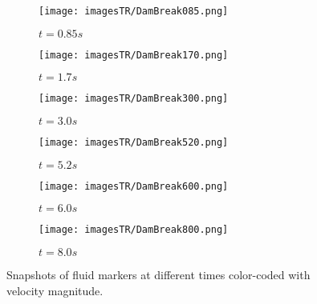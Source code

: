 \begin{figure}[t]
	\centering
	\begin{subfigure}{0.45\columnwidth}
			\centering
		\texttt{[image: imagesTR/DamBreak085.png]}
		\caption{$t=0.85 s$}
	\end{subfigure}
	\begin{subfigure}{0.45\columnwidth}
			\centering
		\texttt{[image: imagesTR/DamBreak170.png]}
	\caption{$t=1.7 s$}
	\end{subfigure}
		\begin{subfigure}{0.45\columnwidth}
			\centering
			\texttt{[image: imagesTR/DamBreak300.png]}
			\caption{ $t=3.0 s$}
		\end{subfigure}
		\begin{subfigure}{0.45\columnwidth}
			\centering
			\texttt{[image: imagesTR/DamBreak520.png]}
			\caption{$t=5.2 s$}
		\end{subfigure}
		\begin{subfigure}{0.45\columnwidth}
			\centering
			\texttt{[image: imagesTR/DamBreak600.png]}
			\caption{$t=6.0 s$}
		\end{subfigure}				
		\begin{subfigure}{0.45\columnwidth}
			\centering
			\texttt{[image: imagesTR/DamBreak800.png]}
			\caption{$t=8.0 s$}
		\end{subfigure}			
	\caption{Snapshots of fluid markers at different times color-coded with velocity magnitude.}
	\label{fig:DamBreak}
\end{figure}